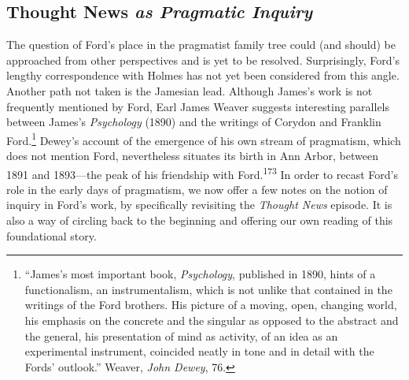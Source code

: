 \documentclass[openany,nobib]{tufte-book}
\begin{document}
\hypertarget{thought-news-as-pragmatic-inquiry}{%
\subsection{\texorpdfstring{Thought News \emph{as Pragmatic
Inquiry}}{Thought News as Pragmatic Inquiry}}\label{thought-news-as-pragmatic-inquiry}}

The question of Ford's place in the pragmatist family tree could (and
should) be approached from other perspectives and is yet to be resolved.
Surprisingly, Ford's lengthy correspondence with Holmes has not yet been
considered from this angle. Another path not taken is the Jamesian lead.
Although James's work is not frequently mentioned by Ford, Earl James
Weaver suggests interesting parallels between James's \emph{Psychology}
(1890) and the writings of Corydon and Franklin Ford.\footnote{``James's
  most important book, \emph{Psychology}, published in 1890, hints of a
  functionalism, an instrumentalism, which is not unlike that contained
  in the writings of the Ford brothers. His picture of a moving, open,
  changing world, his emphasis on the concrete and the singular as
  opposed to the abstract and the general, his presentation of mind as
  activity, of an idea as an experimental instrument, coincided neatly
  in tone and in detail with the Fords’ outlook.'' Weaver, \emph{John
  Dewey}, 76.} Dewey's account of the emergence of his own stream of
pragmatism, which does not mention Ford, nevertheless situates its birth
in Ann Arbor, between 1891 and 1893---the peak of his friendship with
Ford.\textsuperscript{173} In order to recast Ford's role in the
early days of pragmatism, we now offer a few notes on the notion of
inquiry in Ford's work, by specifically revisiting the \emph{Thought
News} episode. It is also a way of circling back to the beginning and
offering our own reading of this foundational story.
\end{document}
